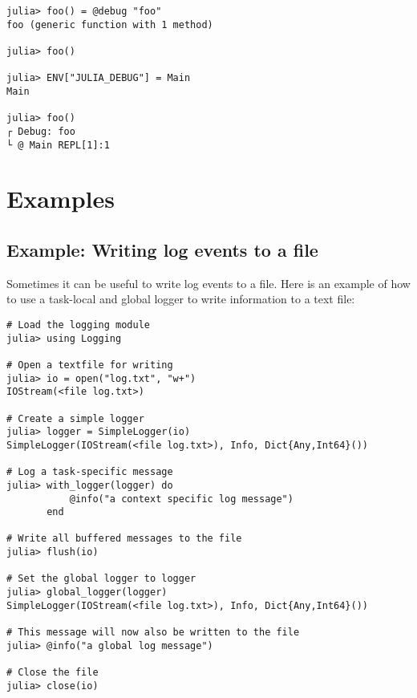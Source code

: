 \begin{verbatim}
julia> foo() = @debug "foo"
foo (generic function with 1 method)

julia> foo()

julia> ENV["JULIA_DEBUG"] = Main
Main

julia> foo()
┌ Debug: foo
└ @ Main REPL[1]:1

\end{verbatim}



\hypertarget{15337950170852396133}{}


\section{Examples}



\hypertarget{14676117237971170639}{}


\subsection{Example: Writing log events to a file}



Sometimes it can be useful to write log events to a file. Here is an example of how to use a task-local and global logger to write information to a text file:




\begin{verbatim}
# Load the logging module
julia> using Logging

# Open a textfile for writing
julia> io = open("log.txt", "w+")
IOStream(<file log.txt>)

# Create a simple logger
julia> logger = SimpleLogger(io)
SimpleLogger(IOStream(<file log.txt>), Info, Dict{Any,Int64}())

# Log a task-specific message
julia> with_logger(logger) do
           @info("a context specific log message")
       end

# Write all buffered messages to the file
julia> flush(io)

# Set the global logger to logger
julia> global_logger(logger)
SimpleLogger(IOStream(<file log.txt>), Info, Dict{Any,Int64}())

# This message will now also be written to the file
julia> @info("a global log message")

# Close the file
julia> close(io)
\end{verbatim}



